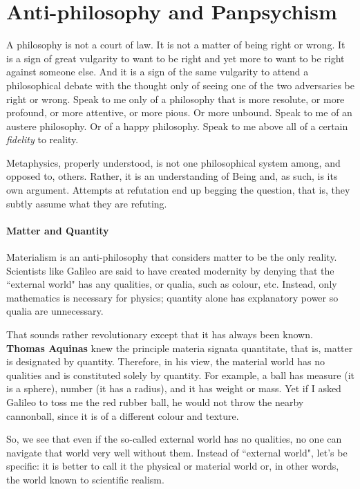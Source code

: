 \section{Anti-philosophy and Panpsychism}

\begin{quotex}
A philosophy is not a court of law. It is not a matter of being right or wrong. It is a sign of great vulgarity to want to be right and yet more to want to be right against someone else. And it is a sign of the same vulgarity to attend a philosophical debate with the thought only of seeing one of the two adversaries be right or wrong. Speak to me only of a philosophy that is more resolute, or more profound, or more attentive, or more pious. Or more unbound. Speak to me of an austere philosophy. Or of a happy philosophy. Speak to me above all of a certain \emph{fidelity} to reality. 

\end{quotex}
Metaphysics, properly understood, is not one philosophical system among, and opposed to, others. Rather, it is an understanding of Being and, as such, is its own argument. Attempts at refutation end up begging the question, that is, they subtly assume what they are refuting.

\paragraph{Matter and Quantity}
Materialism is an anti-philosophy that considers matter to be the only reality. Scientists like Galileo are said to have created modernity by denying that the ``external world" has any qualities, or qualia, such as colour, etc. Instead, only mathematics is necessary for physics; quantity alone has explanatory power so qualia are unnecessary.

That sounds rather revolutionary except that it has always been known. \textbf{Thomas Aquinas} knew the principle materia signata quantitate, that is, matter is designated by quantity. Therefore, in his view, the material world has no qualities and is constituted solely by quantity. For example, a ball has measure (it is a sphere), number (it has a radius), and it has weight or mass. Yet if I asked Galileo to toss me the red rubber ball, he would not throw the nearby cannonball, since it is of a different colour and texture.

So, we see that even if the so-called external world has no qualities, no one can navigate that world very well without them. Instead of ``external world", let's be specific: it is better to call it the physical or material world or, in other words, the world known to scientific realism.

